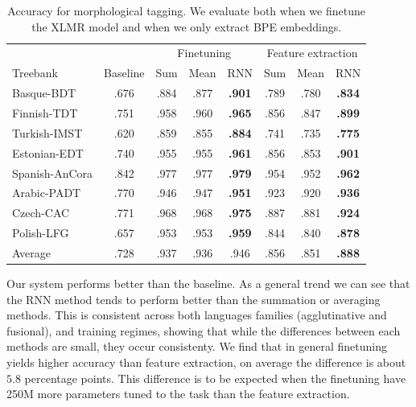 \documentclass[11pt]{article}
\begin{document}
    \begin{table}%
	\centering
	\begin{tabular}{l|c|ccc|ccc}
		& & \multicolumn{3}{c}{Finetuning} & \multicolumn{3}{c}{Feature extraction} \\
		Treebank & Baseline & Sum & Mean & RNN & Sum & Mean & RNN \\
		\hline
		Basque-BDT      & .676 & .884 & .877 & \textbf{.901} & .789 & .780 & \textbf{.834} \\
		Finnish-TDT     & .751 & .958 & .960 & \textbf{.965} & .856 & .847 & \textbf{.899} \\
		Turkish-IMST    & .620 & .859 & .855 & \textbf{.884} & .741 & .735 & \textbf{.775} \\
		Estonian-EDT    & .740 & .955 & .955 & \textbf{.961} & .856 & .853 & \textbf{.901} \\
		Spanish-AnCora  & .842 & .977 & .977 & \textbf{.979} & .954 & .952 & \textbf{.962} \\
		Arabic-PADT     & .770 & .946 & .947 & \textbf{.951} & .923 & .920 & \textbf{.936} \\
		Czech-CAC       & .771 & .968 & .968 & \textbf{.975} & .887 & .881 & \textbf{.924} \\
		Polish-LFG      & .657 & .953 & .953 & \textbf{.959} & .844 & .840 & \textbf{.878} \\
        \hline
        Average         & .728 & .937 & .936 & .946  & .856 & .851 & \textbf{.888} \\
	\end{tabular}
    	\caption{\label{tab:results_tokens} Accuracy for morphological
        tagging. We evaluate both when we finetune the XLMR model and
        when we only extract BPE embeddings.}
    \end{table}


        Our system performs better than the baseline. As a general
        trend we can see that the RNN method tends to perform better
        than the summation or averaging methods. This is consistent
        across both languages families (agglutinative and fusional),
        and training regimes, showing that while the differences between each methods are
        small, they occur consistenty.
        We find that in general finetuning yields higher accuracy than
        feature extraction, on average the difference is about $5.8$
        percentage points.  This difference is to be expected when the
        finetuning have 250M more parameters tuned to the task than the
        feature extraction. %
    
\end{document}
